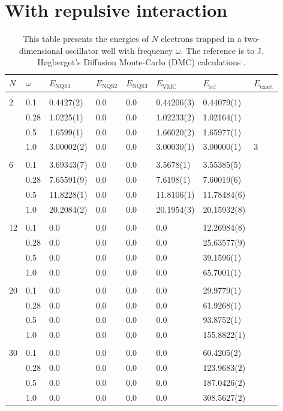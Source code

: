 \section{With repulsive interaction}
\begin{table} [H]
	\caption{This table presents the energies of $N$ electrons trapped in a two-dimensional oscillator well with frequency $\omega$. The reference is to J. Høgberget's Diffusion Monte-Carlo (DMC) calculations \cite{hogberget_quantum_2013}.} 
	\begin{tabularx}{\textwidth}{l:l|XXXXXX} \hline\hline
		\label{tab:quantumdotswinteraction2D}
		$N$ & $\omega$ & $E_{\text{NQS1}}$ & $E_{\text{NQS2}}$ & $E_{\text{NQS3}}$ & $E_{\text{VMC}}$ & $E_{\text{ref}} $ & $E_{\text{exact}}$ \\ \hline \\
		2 & 0.1 & 0.4427(2) & 0.0 & 0.0 & 0.44206(3) & 0.44079(1) & \\ 
		& 0.28 & 1.0225(1) & 0.0 & 0.0 & 1.02233(2) & 1.02164(1) & \\
		& 0.5 & 1.6599(1) & 0.0 & 0.0 & 1.66020(2) & 1.65977(1)  \\
		& 1.0 & 3.00002(2) & 0.0 & 0.0 & 3.00030(1) & 3.00000(1) & 3  \\ \hdashline \\
		
		6 & 0.1 & 3.69343(7) & 0.0 & 0.0 & 3.5678(1) & 3.55385(5) \\ 
		& 0.28 & 7.65591(9) & 0.0 & 0.0 & 7.6198(1) & 7.60019(6) \\
		& 0.5 & 11.8228(1) & 0.0 & 0.0 & 11.8106(1) & 11.78484(6) \\
		& 1.0 & 20.2084(2) & 0.0 & 0.0 & 20.1954(3) & 20.15932(8) \\ \hdashline \\
		
		12 & 0.1 & 0.0 & 0.0 & 0.0 & 0.0 & 12.26984(8) \\ 
		& 0.28 & 0.0 & 0.0 & 0.0 & 0.0 & 25.63577(9) \\
		& 0.5 & 0.0 & 0.0 & 0.0 & 0.0 & 39.1596(1) \\
		& 1.0 & 0.0 & 0.0 & 0.0 & 0.0 & 65.7001(1) \\ \hdashline \\
		
		20 & 0.1 & 0.0 & 0.0 & 0.0 & 0.0 & 29.9779(1) \\ 
		& 0.28 & 0.0 & 0.0 & 0.0 & 0.0 & 61.9268(1) \\
		& 0.5 & 0.0 & 0.0 & 0.0 & 0.0 & 93.8752(1) \\
		& 1.0 & 0.0 & 0.0 & 0.0 & 0.0 & 155.8822(1) \\ \hdashline \\
		
		30 & 0.1 & 0.0 & 0.0 & 0.0 & 0.0 & 60.4205(2)\\ 
		& 0.28 & 0.0 & 0.0 & 0.0 & 0.0 & 123.9683(2)\\
		& 0.5 & 0.0 & 0.0 & 0.0 & 0.0 & 187.0426(2)\\
		& 1.0 & 0.0 & 0.0 & 0.0 & 0.0 & 308.5627(2)\\ \hline\hline
	\end{tabularx}
\end{table}

